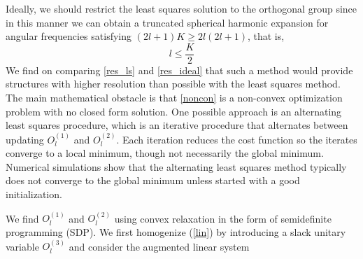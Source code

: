 Ideally, we should restrict the least squares solution to the orthogonal group since in this manner we can obtain a truncated spherical harmonic expansion for angular frequencies satisfying $(2l+1)K \geq 2l(2l+1)$, that is,
\begin{equation}\label{res_ideal}
l \leq \frac{K}{2}
\end{equation}
We find on comparing \eqref{res_ls} and \eqref{res_ideal} that such a method would provide structures with higher resolution than possible with the least squares method. The main mathematical obstacle is that \eqref{noncon} is a non-convex optimization problem with no closed form solution. One possible approach is an alternating least squares procedure, which is an iterative procedure that alternates between updating $O_l^{(1)}$ and $O_l^{(2)}$. Each iteration reduces the cost function so the iterates converge to a local minimum, though not necessarily the global minimum. Numerical simulations show that the alternating least squares method typically does not converge to the global minimum unless started with a good initialization.

We find $O_l^{(1)}$ and $O_l^{(2)}$ using convex relaxation in the form of
semidefinite programming (SDP). We first homogenize (\ref{lin}) by introducing a
slack unitary variable $O_l^{(3)}$ and consider
the augmented linear system

